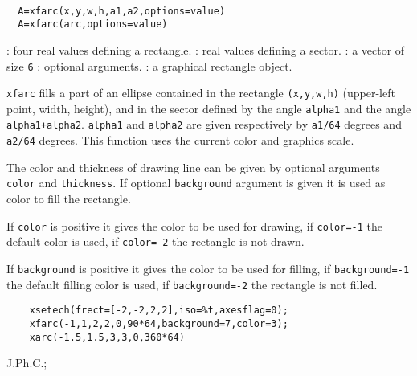 \begin{mandesc}
  \\ %
\end{mandesc}
\begin{calling_sequence}
\begin{verbatim}
  A=xfarc(x,y,w,h,a1,a2,options=value)
  A=xfarc(arc,options=value)
\end{verbatim}
\end{calling_sequence}
\begin{parameters}
  \begin{varlist}
    : four real values defining a rectangle.
    : real values defining a sector.
    : a vector of size \verb!6! 
    : optional arguments.
    : a graphical rectangle object.
  \end{varlist}
\end{parameters}

\begin{mandescription}
  \verb!xfarc! fills a part of an ellipse contained in the rectangle 
  \verb!(x,y,w,h)!
  (upper-left point, width, height), and in the sector defined by 
  the angle \verb!alpha1! and the angle \verb!alpha1+alpha2!. 
  \verb!alpha1! and \verb!alpha2! are 
  given respectively by \verb!a1/64! degrees and \verb!a2/64! degrees.
  This function uses the current color and graphics scale.

  The color and thickness of drawing line can be given by optional arguments
  \verb!color! and \verb!thickness!. If optional \verb!background!
  argument is given it is used as color to fill the rectangle.

  If \verb!color! is positive it gives the color to be used for drawing,
  if \verb!color=-1! the default color is used, if  \verb!color=-2! the
  rectangle is not drawn.

  If \verb!background! is positive it gives the color to be used for filling,
  if \verb!background=-1! the default filling color is used,
  if  \verb!background=-2! the rectangle is not filled.
  
\end{mandescription}

\begin{examples}
  \begin{Verbatim}
    xsetech(frect=[-2,-2,2,2],iso=%t,axesflag=0);
    xfarc(-1,1,2,2,0,90*64,background=7,color=3);
    xarc(-1.5,1.5,3,3,0,360*64)
  \end{Verbatim}
\end{examples}

\begin{manseealso}
     
\end{manseealso}


\begin{authors}
  J.Ph.C.;   

\end{authors}

